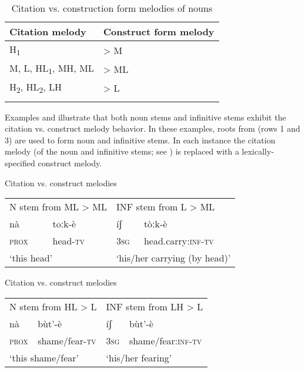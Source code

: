 \documentclass[output=paper]{langsci/langscibook}
\begin{document}
\begin{table}
\caption{Citation vs. construction form melodies of nouns}
\label{tab:mahland:4}

\begin{tabular}{ll} 
\lsptoprule

  Citation melody &   Construct form melody\\
\midrule
H\textsubscript{1} & {>} M\\
M, L, HL\textsubscript{1}, MH, ML & {>} ML\\
H\textsubscript{2}, HL\textsubscript{2}, LH & {>} L\\
\lspbottomrule
\end{tabular}
\end{table}

Examples  and  illustrate that both noun stems and infinitive stems exhibit the citation vs. construct melody behavior. In these examples, roots from  (rows 1 and 3) are used to form noun and infinitive stems. In each instance the citation melody (of the noun and infinitive stems; see ) is replaced with a lexically-specified construct melody.  

\ea\label{ex:mahland:24}{Citation vs. construct melodies}\\
\begin{tabular}{llll}
\multicolumn{2}{l}{N stem from ML > ML} & \multicolumn{2}{l}{INF stem from L > ML} \\
nà   &   toːk-è  &  íʃ   &   tòːk-è\\
\textsc{prox} &  head\textsc{{}-tv} & \textsc{3sg}  &  head.carry\textsc{:inf-tv}\\
\multicolumn{2}{l}{`this head'} & \multicolumn{2}{l}{`his/her carrying (by head)'}
\end{tabular}
\z

\ea\label{ex:mahland:25}{Citation vs. construct melodies}\\
\begin{tabular}{llll}
\multicolumn{2}{l}{N stem from HL > L} & \multicolumn{2}{l}{INF stem from LH > L} \\
nà   & 	bùt'-è	&	íʃ    &  	bùt'-è \\
\textsc{prox}  & shame/fear\textsc{{}-tv}  & \textsc{3sg}  &   shame/fear:\textsc{inf-tv} \\
\multicolumn{2}{l}{`this shame/fear'} & \multicolumn{2}{l}{`his/her fearing'}
\end{tabular}
\z
\end{document}

